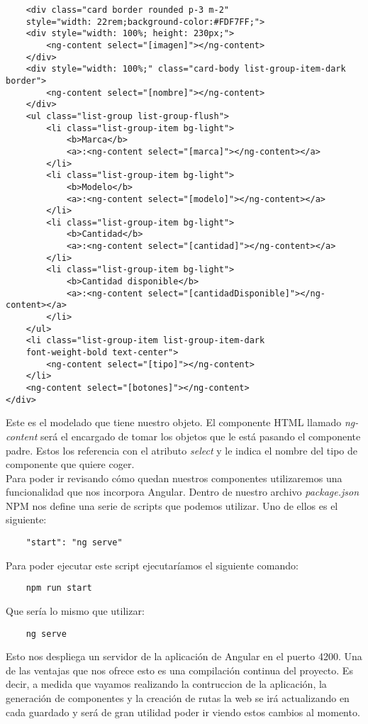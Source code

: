 \begin{verbatim}
    <div class="card border rounded p-3 m-2" 
    style="width: 22rem;background-color:#FDF7FF;">
    <div style="width: 100%; height: 230px;">
        <ng-content select="[imagen]"></ng-content>
    </div>
    <div style="width: 100%;" class="card-body list-group-item-dark border">
        <ng-content select="[nombre]"></ng-content>
    </div>
    <ul class="list-group list-group-flush">
        <li class="list-group-item bg-light">
            <b>Marca</b>
            <a>:<ng-content select="[marca]"></ng-content></a>
        </li>
        <li class="list-group-item bg-light">
            <b>Modelo</b>
            <a>:<ng-content select="[modelo]"></ng-content></a>
        </li>
        <li class="list-group-item bg-light">
            <b>Cantidad</b>
            <a>:<ng-content select="[cantidad]"></ng-content></a>
        </li>
        <li class="list-group-item bg-light">
            <b>Cantidad disponible</b>
            <a>:<ng-content select="[cantidadDisponible]"></ng-content></a>
        </li>
    </ul>
    <li class="list-group-item list-group-item-dark 
    font-weight-bold text-center">
        <ng-content select="[tipo]"></ng-content>
    </li>
    <ng-content select="[botones]"></ng-content>
</div>
\end{verbatim}
Este es el modelado que tiene nuestro objeto. El componente HTML llamado \textit{ng-content} será el encargado de tomar los objetos que le está pasando el componente padre. Estos los referencia con el atributo \textit{select} y le indica el nombre del tipo de componente que quiere coger.
\\Para poder ir revisando cómo quedan nuestros componentes utilizaremos una funcionalidad que nos incorpora Angular. Dentro de nuestro archivo \textit{package.json} NPM nos define una serie de scripts que podemos utilizar. Uno de ellos es el siguiente:
\begin{verbatim}
    "start": "ng serve"
\end{verbatim}
Para poder ejecutar este script ejecutaríamos el siguiente comando:
\begin{verbatim}
    npm run start
\end{verbatim}
Que sería lo mismo que utilizar:
\begin{verbatim}
    ng serve
\end{verbatim}
Esto nos despliega un servidor de la aplicación de Angular en el puerto 4200. Una de las ventajas que nos ofrece esto es una compilación continua del proyecto. Es decir, a medida que vayamos realizando la contruccion de la aplicación, la generación de componentes y la creación de rutas la web se irá actualizando en cada guardado y será de gran utilidad poder ir viendo estos cambios al momento.